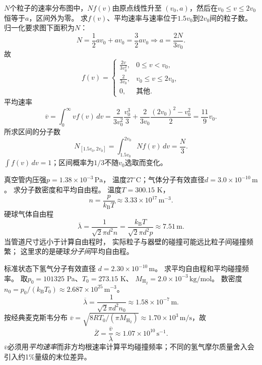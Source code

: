 \problemtext $N$个粒子的速率分布图中，$Nf(v)$由原点线性升至
$(v_0,a)$，然后在$v_0\le v\le2v_0$恒等于$a$，区间外为零。
求$f(v)$、平均速率与速率位于$1.5v_0$到$2v_0$间的粒子数。
\workings
归一化要求图下面积为$N$：
\[
N=\frac12av_0+av_0=\frac32av_0
\Longrightarrow a=\frac{2N}{3v_0}.
\]
故
\[
\boxed{f(v)=
\begin{cases}
\frac{2v}{3v_0^2},&0\le v<v_0,\\
\frac{2}{3v_0},&v_0\le v\le2v_0,\\
0,&\text{其他}.
\end{cases}}
\]
平均速率
\[
\overline v=\int_0^\infty v f(v)\,dv
=\frac{2}{3v_0^2}\frac{v_0^3}{3}
+\frac{2}{3v_0}\frac{(2v_0)^2-v_0^2}{2}
=\boxed{\frac{11}{9}v_0}.
\]
所求区间的分子数
\[
\boxed{N_{[1.5v_0,2v_0]}
=\int_{1.5v_0}^{2v_0}Nf(v)\,dv
=\frac N3}.
\]
\crosscheck $\int f(v)\,dv=1$；区间概率为$1/3$不随$v_0$选取而变化。

\problemtext 真空管内压强$p=1.38\times10^{-3}\,\mathrm{Pa}$，
温度$27^\circ\mathrm C$；气体分子有效直径$d=3.0\times10^{-10}\,\mathrm m$。
求分子数密度和平均自由程。
\workings
温度$T=300.15$ K，
\[
\boxed{n=\frac p{k_{\mathrm B}T}
\approx3.33\times10^{17}\,\mathrm{m^{-3}}}.
\]
硬球气体自由程
\[
\boxed{\overline\lambda
=\frac{1}{\sqrt2\pi d^2n}
=\frac{k_{\mathrm B}T}{\sqrt2\pi d^2p}
\approx7.51\,\mathrm m}.
\]
\crosscheck 当管道尺寸远小于计算自由程时，
实际粒子与器壁的碰撞可能远比粒子间碰撞频繁；
这里求的是硬球\emph{分子间}平均自由程。

\problemtext 标准状态下氢气分子有效直径
$d=2.30\times10^{-10}\,\mathrm m$。
求平均自由程和平均碰撞频率。
\workings
取$p_0=101325$ Pa、$T_0=273.15$ K、
$M_{\mathrm{H_2}}=2.0\times10^{-3}\,\mathrm{kg/mol}$。
数密度
$n_0=p_0/(k_{\mathrm B}T_0)\approx2.687\times10^{25}\,\mathrm{m^{-3}}$。
\[
\boxed{\overline\lambda=
\frac{1}{\sqrt2\pi d^2n_0}
\approx1.58\times10^{-7}\,\mathrm m}.
\]
按经典麦克斯韦分布
$\overline v=\sqrt{8RT_0/(\pi M_{\mathrm{H_2}})}
\approx1.70\times10^3\,\mathrm{m/s}$，故
\[
\boxed{\overline Z=\frac{\overline v}{\overline\lambda}
\approx1.07\times10^{10}\,\mathrm{s^{-1}}}.
\]
\crosscheck $\overline v$必须用\emph{平均速率}而非方均根速率计算平均碰撞频率；不同的氢气摩尔质量舍入会引入约1\%量级的末位差异。
